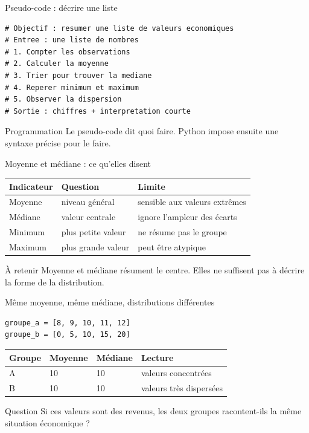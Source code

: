 \documentclass[10pt,aspectratio=169]{beamer}
\begin{document}
\begin{frame}[fragile]{Pseudo-code : décrire une liste}
\begin{lstlisting}
# Objectif : resumer une liste de valeurs economiques
# Entree : une liste de nombres
# 1. Compter les observations
# 2. Calculer la moyenne
# 3. Trier pour trouver la mediane
# 4. Reperer minimum et maximum
# 5. Observer la dispersion
# Sortie : chiffres + interpretation courte
\end{lstlisting}
\begin{block}{Programmation}
Le pseudo-code dit quoi faire. Python impose ensuite une syntaxe précise pour le faire.
\end{block}
\end{frame}

\begin{frame}{Moyenne et médiane : ce qu'elles disent}
\begin{tabular}{@{}lll@{}}
\toprule
Indicateur & Question & Limite \\
\midrule
Moyenne & niveau général & sensible aux valeurs extrêmes \\
Médiane & valeur centrale & ignore l'ampleur des écarts \\
Minimum & plus petite valeur & ne résume pas le groupe \\
Maximum & plus grande valeur & peut être atypique \\
\bottomrule
\end{tabular}
\vspace{0.45cm}
\begin{block}{À retenir}
Moyenne et médiane résument le centre. Elles ne suffisent pas à décrire la forme de la distribution.
\end{block}
\end{frame}

\begin{frame}[fragile]{Même moyenne, même médiane, distributions différentes}
\begin{lstlisting}
groupe_a = [8, 9, 10, 11, 12]
groupe_b = [0, 5, 10, 15, 20]
\end{lstlisting}
\begin{tabular}{@{}llll@{}}
\toprule
Groupe & Moyenne & Médiane & Lecture \\
\midrule
A & 10 & 10 & valeurs concentrées \\
B & 10 & 10 & valeurs très dispersées \\
\bottomrule
\end{tabular}
\vspace{0.4cm}
\begin{block}{Question}
Si ces valeurs sont des revenus, les deux groupes racontent-ils la même situation économique ?
\end{block}
\end{frame}
\end{document}
